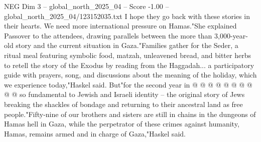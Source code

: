 \begin{textsample}{NEG Dim 3 – global\_north\_2025\_04 – Score -1.00 – global\_north\_2025\_04/123152035.txt}
I hope they go back with these stories in their hearts.
We need more international pressure on Hamas."She explained Passover to the attendees, drawing parallels between the more than 3,000-year-old story and the current situation in Gaza."Families gather for the Seder, a ritual meal featuring symbolic food, matzah, unleavened bread, and bitter herbs to retell the story of the Exodus by reading from the Haggadah... a participatory guide with prayers, song, and discussions about the meaning of the holiday, which we experience today,"Haskel said.
But"for the second year in @ @ @ @ @ @ @ @ @ @ so fundamental to Jewish and Israeli identity -- the original story of Jews breaking the shackles of bondage and returning to their ancestral land as free people."Fifty-nine of our brothers and sisters are still in chains in the dungeons of Hamas hell in Gaza, while the perpetrator of these crimes against humanity, Hamas, remains armed and in charge of Gaza,"Haskel said.

\end{textsample}
